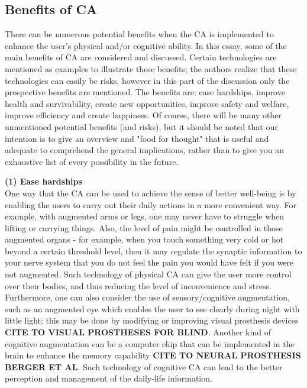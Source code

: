 \subsection{Benefits of CA}

There can be numerous potential benefits when the CA is implemented to enhance the user's physical and/or cognitive ability. In this essay, some of the main benefits of CA are considered and discussed. Certain technologies are mentioned as examples to illustrate these benefits; the authors realize that these technologies can easily be risks, however in this part of the discussion only the prospective benefits are mentioned. The benefits are: ease hardships, improve health and survivability, create new opportunities, improve safety and welfare, improve efficiency and create happiness. Of course, there will be many other unmentioned potential benefits (and risks), but it should be noted that our intention is to give an overview and "food for thought" that is useful and adequate to comprehend the general implications, rather than to give you an exhaustive list of every possibility in the future. 

{\bf (1) Ease hardships} \\ 
One way that the CA can be used to achieve the sense of better well-being is by enabling the users to carry out their daily actions in a more convenient way. For example, with augmented arms or legs, one may never have to struggle when lifting or carrying things. Also, the level of pain might be controlled in those augmented organs - for example, when you touch something very cold or hot beyond a certain threshold level, then it may regulate the synaptic information to your nerve system that you do not feel the pain you would have felt if you were not augmented. Such technology of physical CA can give the user more control over their bodies, and thus reducing the level of inconvenience and stress. Furthermore, one can also consider the use of sensory/cognitive augmentation, such as an augmented eye which enables the user to see clearly during night with little light; this may be done by modifying or improving visual prosthesis devices {\bf CITE TO VISUAL PROSTHESES FOR BLIND}. Another kind of cognitive augmentation can be a computer chip that can be implemented in the brain to enhance the memory capability {\bf CITE TO NEURAL PROSTHESIS BERGER ET AL}. Such technology of cognitive CA can lead to the better perception and management of the daily-life information.

